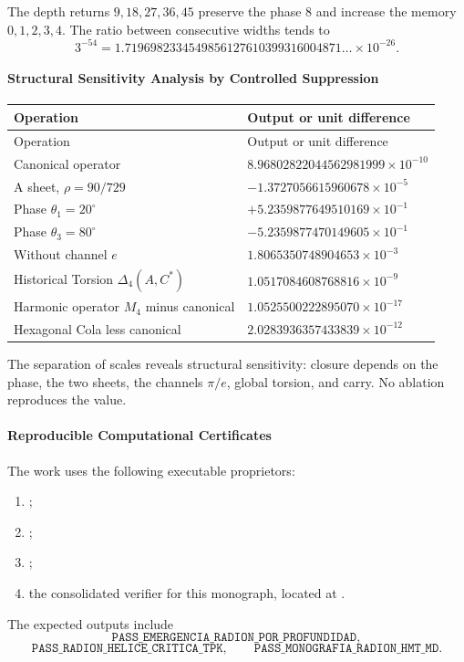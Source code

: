 The depth returns \(9,18,27,36,45\) preserve the phase \(8\) and
increase the memory \(0,1,2,3,4\). The ratio between consecutive widths tends
to
\[
3^{-54}=1.7196982334549856127610399316004871\ldots\times10^{-26}.
\]

\paragraph{Structural Sensitivity Analysis by Controlled Suppression}

\begin{longtable}{p{} p{}}
\toprule
Operation & Output or unit difference\\
\midrule
\endfirsthead
\toprule
Operation & Output or unit difference\\
\midrule
\endhead
Canonical operator & \(8.96802822044562981999\times10^{-10}\)\\
A sheet, \(\rho=90/729\) & \(-1.3727056615960678\times10^{-5}\)\\
Phase \(\theta_1=20^\circ\) & \(+5.2359877649510169\times10^{-1}\)\\
Phase \(\theta_3=80^\circ\) & \(-5.2359877470149605\times10^{-1}\)\\
Without channel \(e\) & \(1.8065350748904653\times10^{-3}\)\\
Historical Torsion \(\Delta_4(A,C^*)\) & \(1.0517084608768816\times10^{-9}\)\\
Harmonic operator \(M_4\) minus canonical & \(1.0525500222895070\times10^{-17}\)\\
Hexagonal Cola less canonical & \(2.0283936357433839\times10^{-12}\)\\
\bottomrule
\end{longtable}

The separation of scales reveals structural sensitivity: closure depends
on the phase, the two sheets, the channels \(\pi/e\), global torsion, and carry.
No ablation reproduces the value.

\paragraph{Reproducible Computational Certificates}

The work uses the following executable proprietors:
\begin{enumerate}
\item {};
\item {};
\item {};
\item the consolidated verifier for this monograph, located at
.
\end{enumerate}
The expected outputs include
\[
\texttt{PASS\_EMERGENCIA\_RADION\_POR\_PROFUNDIDAD},
\]
\[
\texttt{PASS\_RADION\_HELICE\_CRITICA\_TPK},
\qquad
\texttt{PASS\_MONOGRAFIA\_RADION\_HMT\_MD}.
\]

